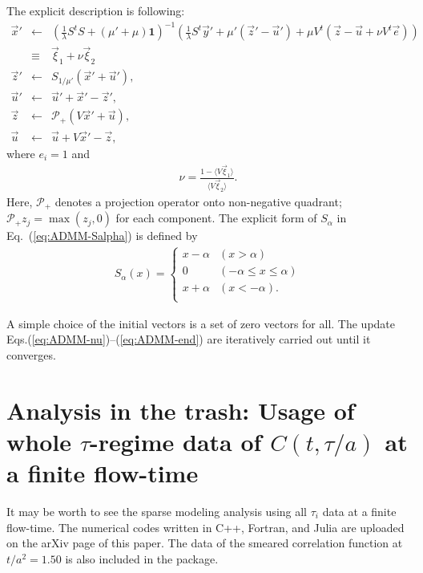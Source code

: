 \documentclass[a4paper,11pt]{article}
\newcommand\beq{ \begin{eqnarray} }
\newcommand\eeq{ \end{eqnarray} }
\begin{document}
The explicit description is following:
\beq
\vec{x}' &\leftarrow& \left( \frac{1}{\lambda} S^t S + (\mu'+\mu) \mathbf{1}  \right)^{-1} \left( \frac{1}{\lambda} S^t \vec{y}' + \mu' (\vec{z}' -\vec{u}') +\mu V^t (\vec{z}-\vec{u} + \nu V^t \vec{e}) \right) \label{eq:ADMM-nu}\\
&\equiv& \vec{\xi}_1 + \nu \vec{\xi}_2\\
\vec{z}' & \leftarrow & S_{1/\mu'} (\vec{x}' + \vec{u}'),\label{eq:ADMM-Salpha}\\
\vec{u}' &\leftarrow & \vec{u}' + \vec{x}' -\vec{z}' ,\\
\vec{z} & \leftarrow & \mathcal{P}_+ (V\vec{x}' + \vec{u}),\\
\vec{u} & \leftarrow & \vec{u} + V \vec{x}' -\vec{z},\label{eq:ADMM-end}
\eeq
where $e_i =1$ and 
\beq
\nu = \frac{1 - \langle V \vec{\xi}_1 \rangle }{\langle V \vec{\xi}_2 \rangle}.
\eeq
Here, $\mathcal{P}_+$ denotes a projection operator onto non-negative quadrant; $\mathcal{P}_+ z_j = \max(z_j,0)$ for each component.
The explicit form of $S_\alpha$ in Eq.~(\ref{eq:ADMM-Salpha}) is defined by
\beq
S_\alpha (x) =
\left\{ \begin{array}{ll}
x-\alpha & (x>\alpha) \\
0 & (-\alpha \le x \le \alpha) \\
x+\alpha & (x< -\alpha) .\\
\end{array} \right.
\eeq

A simple choice of the initial vectors is a set of zero vectors for all.
The update Eqs.(\ref{eq:ADMM-nu})--(\ref{eq:ADMM-end}) are iteratively carried out until it converges.




\section{Analysis in the trash: Usage of whole $\tau$-regime data of $C(t,\tau/a)$ at a finite flow-time }\label{sec:All-tau-analysis}
It may be worth to see the sparse modeling analysis using all $\tau_i$ data at a finite flow-time.
The numerical codes written in C++, Fortran, and Julia are uploaded on the arXiv page of this paper.
The data of the smeared correlation function at $t/a^2=1.50$ is also included in the package.
\end{document}

